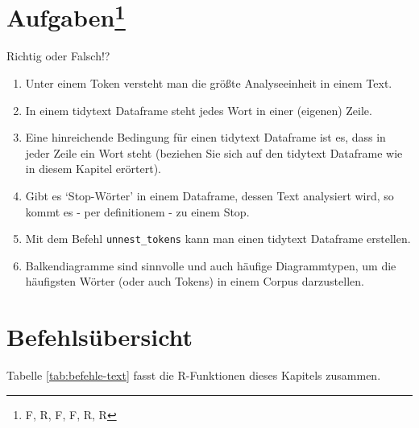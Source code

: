 \documentclass[12pt,ngerman,]{book}
\providecommand{\tightlist}{%
  \setlength{\itemsep}{0pt}\setlength{\parskip}{0pt}}
\let\rmarkdownfootnote\footnote%
\def\footnote{\protect\rmarkdownfootnote}
\theoremstyle{definition}
\theoremstyle{definition}
\theoremstyle{remark}
\let\BeginKnitrBlock\begin \let\EndKnitrBlock\end
\begin{document}
\section[Aufgaben]{\texorpdfstring{Aufgaben\footnote{F, R, F, F, R, R}}{Aufgaben}}\label{aufgaben-13}

\BeginKnitrBlock{rmdexercises}
Richtig oder Falsch!?

\begin{enumerate}
\def\labelenumi{\arabic{enumi}.}
\tightlist
\item
  Unter einem Token versteht man die größte Analyseeinheit in einem
  Text.
\item
  In einem tidytext Dataframe steht jedes Wort in einer (eigenen) Zeile.
\item
  Eine hinreichende Bedingung für einen tidytext Dataframe ist es, dass
  in jeder Zeile ein Wort steht (beziehen Sie sich auf den tidytext
  Dataframe wie in diesem Kapitel erörtert).
\item
  Gibt es `Stop-Wörter' in einem Dataframe, dessen Text analysiert wird,
  so kommt es - per definitionem - zu einem Stop.
\item
  Mit dem Befehl \texttt{unnest\_tokens} kann man einen tidytext
  Dataframe erstellen.
\item
  Balkendiagramme sind sinnvolle und auch häufige Diagrammtypen, um die
  häufigsten Wörter (oder auch Tokens) in einem Corpus darzustellen.
\end{enumerate}
\EndKnitrBlock{rmdexercises}

\section{Befehlsübersicht}\label{befehlsubersicht-11}

Tabelle \ref{tab:befehle-text} fasst die R-Funktionen dieses Kapitels
zusammen.
\end{document}
